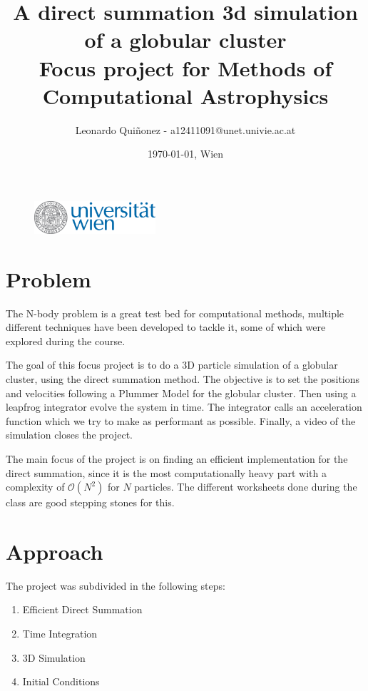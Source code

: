 \documentclass[a4paper, 11pt]{article}         %
\makeatletter
\newcommand{\titlefirstpage}{A direct summation 3d simulation of a globular cluster}
\newcommand{\authorname}{Leonardo Quiñonez}
\newcommand{\authormail}{a12411091@unet.univie.ac.at}
\newcommand{\authordate}{\today{}}
\newcommand{\authorplace}{Wien}
\makeatother
\begin{document}
\begin{figure}                                  %
\flushleft
\includegraphics[width=0.4\textwidth]{univienna-logo.eps}
\end{figure}

\title{\titlefirstpage{} \\ \large Focus project for Methods of Computational Astrophysics}

\author{\authorname{} - \authormail{}}
\date{\authordate, \authorplace}

\maketitle                                      %

\section{Problem}                              %

The N-body problem is a great test bed for computational methods,
multiple different techniques have been developed to tackle it, some of which were explored during the course. \parencite{Hahn2025classnotes}

The goal of this focus project is to do a 3D particle simulation  of a globular cluster, using the direct summation method. 
The objective is to set the positions and velocities following a Plummer Model for the globular cluster. Then using a leapfrog integrator evolve the system in time. The integrator calls an acceleration function which we try to make as performant as possible. Finally, a video of the simulation closes the project.

The main focus of the project is on finding an efficient implementation for the direct summation,
since it is the most computationally heavy part with a complexity of \( \mathcal{O}(N^2) \) for \( N \) particles. The different worksheets done during the class are good stepping stones for this.



\section{Approach}                              %
The project was subdivided in the following steps:
\begin{enumerate}
    \item Efficient Direct Summation
    \item Time Integration
    \item 3D Simulation
    \item Initial Conditions
\end{enumerate}
\end{document}
